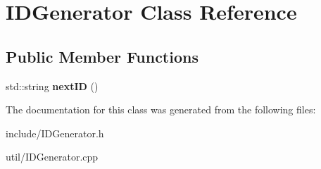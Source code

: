 \hypertarget{classIDGenerator}{\section{I\-D\-Generator Class Reference}
\label{classIDGenerator}
}
\subsection*{Public Member Functions}
\begin{DoxyCompactItemize}
\item 
\hypertarget{classIDGenerator_a223bf057a0ad9e69df527142dfe1e91b}{std\-::string {\bfseries next\-I\-D} ()}\label{classIDGenerator_a223bf057a0ad9e69df527142dfe1e91b}

\end{DoxyCompactItemize}


The documentation for this class was generated from the following files\-:\begin{DoxyCompactItemize}
\item 
include/I\-D\-Generator.\-h\item 
util/I\-D\-Generator.\-cpp\end{DoxyCompactItemize}
